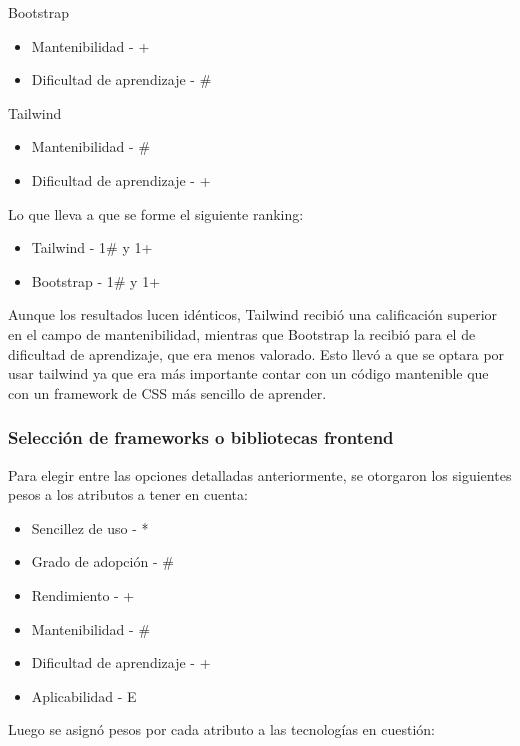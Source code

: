 \documentclass{article}
\begin{document}
Bootstrap
\begin{itemize}
    \item Mantenibilidad - +
    \item Dificultad de aprendizaje - \#
\end{itemize}
Tailwind
\begin{itemize}
    \item Mantenibilidad - \#
    \item Dificultad de aprendizaje - +
\end{itemize}
Lo que lleva a que se forme el siguiente ranking:
\begin{itemize}
    \item Tailwind - 1\# y 1+
    \item Bootstrap - 1\# y 1+
\end{itemize}
Aunque los resultados lucen idénticos, Tailwind recibió una calificación superior en el campo de mantenibilidad, mientras que Bootstrap la recibió para el de dificultad de aprendizaje, que era menos valorado. Esto llevó a que se optara por usar tailwind ya que era más importante contar con un código mantenible que con un framework de CSS más sencillo de aprender.
\subsubsection{Selección de frameworks o bibliotecas frontend}
Para elegir entre las opciones detalladas anteriormente, se otorgaron los siguientes pesos a los atributos a tener en cuenta:
\begin{itemize}
    \item Sencillez de uso - *
    \item Grado de adopción - \#
    \item Rendimiento - +
    \item Mantenibilidad - \#
    \item Dificultad de aprendizaje - +
    \item Aplicabilidad - E
\end{itemize}
Luego se asignó pesos por cada atributo a las tecnologías en cuestión:
\end{document}
